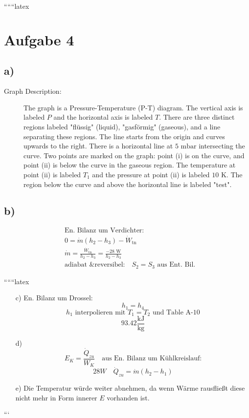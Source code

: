 
``````latex


\section*{Aufgabe 4}

\subsection*{a)}

\begin{description}
    \item[Graph Description:] The graph is a Pressure-Temperature (P-T) diagram. The vertical axis is labeled \( P \) and the horizontal axis is labeled \( T \). There are three distinct regions labeled "flüssig" (liquid), "gasförmig" (gaseous), and a line separating these regions. The line starts from the origin and curves upwards to the right. There is a horizontal line at \( 5 \text{ mbar} \) intersecting the curve. Two points are marked on the graph: point (i) is on the curve, and point (ii) is below the curve in the gaseous region. The temperature at point (ii) is labeled \( T_1 \) and the pressure at point (ii) is labeled \( 10 \text{ K} \). The region below the curve and above the horizontal line is labeled "test".
\end{description}

\subsection*{b)}

\begin{align*}
    &\text{En. Bilanz um Verdichter:} \\
    &0 = \dot{m} (h_2 - h_3) - \dot{W}_{\text{tn}} \\
    &\dot{m} = \frac{\dot{W}_{\text{tn}}}{h_2 - h_3} = \frac{-28 \text{ W}}{h_2 - h_3} \\
    &\text{adiabat \& reversibel:} \quad S_2 = S_3 \text{ aus Ent. Bil.}
\end{align*}

``````latex


\begin{itemize}
    \item[c)] En. Bilanz um Drossel:
    \[
    h_1 = h_4
    \]
    \[
    h_1 \text{ interpolieren mit } T_1 = T_2 \text{ und Table A-10}
    \]
    \[
    93.42 \frac{\text{kJ}}{\text{kg}}
    \]

    \item[d)] \[
    E_K = \frac{\dot{Q}_{zu}}{W_K} \quad \text{aus En. Bilanz um Kühlkreislauf:}
    \]
    \[
    28W \quad \dot{Q}_{zu} = \dot{m} (h_2 - h_1)
    \]

    \item[e)] Die Temperatur würde weiter abnehmen, da wenn Wärme rausfließt diese nicht mehr in Form innerer $E$ vorhanden ist. 
\end{itemize}

```